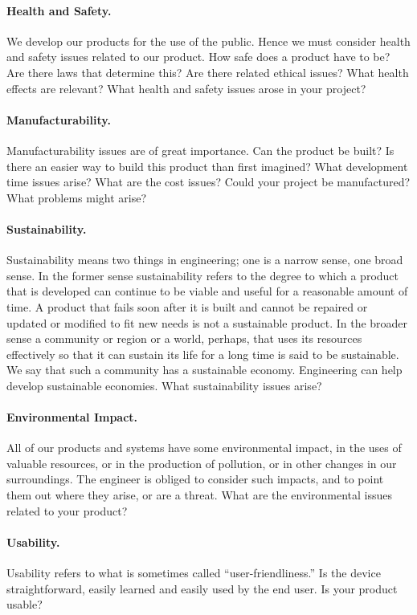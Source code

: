 \paragraph{Health and Safety.}
We develop our products for the use of the public. Hence we must consider health and safety issues related to our product. How safe does a product have to be? Are there laws that determine this? Are there related ethical issues? What health effects are relevant? What health and safety issues arose in your project?

\paragraph{Manufacturability.}
Manufacturability issues are of great importance. Can the product be built? Is there an easier way to build this product than first imagined? What development time issues arise? What are the cost issues? Could your project be manufactured? What problems might arise?

\paragraph{Sustainability.}
Sustainability means two things in engineering; one is a narrow sense, one broad sense. In the former sense sustainability refers to the degree to which a product that is developed can continue to be viable and useful for a reasonable amount of time. A product that fails soon after it is built and cannot be repaired or updated or modified to fit new needs is not a sustainable product. In the broader sense a community or region or a world, perhaps, that uses its resources effectively so that it can sustain its life for a long time is said to be sustainable. We say that such a community has a sustainable economy. Engineering can help develop sustainable economies. What sustainability issues arise?

\paragraph{Environmental Impact.}
All of our products and systems have some environmental impact, in the uses of valuable resources, or in the production of pollution, or in other changes in our surroundings. The engineer is obliged to consider such impacts, and to point them out where they arise, or are a threat. What are the environmental issues related to your product?

\paragraph{Usability.}
Usability refers to what is sometimes called ``user-friendliness.'' Is the device straightforward, easily learned and easily used by the end user. Is your product usable?

